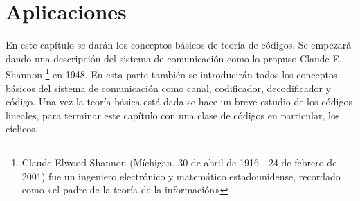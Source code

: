 \chapter{\quad Aplicaciones}
En este capítulo se darán los conceptos básicos de teoría de códigos. Se empezará dando una descripción del sistema de comunicación como lo propuso Claude E. Shannon \footnote{Claude Elwood Shannon (Míchigan, 30 de abril de 1916 - 24 de febrero de 2001) fue un ingeniero electrónico y matemático estadounidense, recordado como «el padre de la teoría de la información»} en 1948. En esta parte también se introducirán todos los conceptos básicos del sistema de comunicación como canal, codificador, decodificador y código. Una vez la teoría básica está dada se hace un breve estudio de los códigos lineales, para terminar este capítulo con una clase de códigos en particular, los cíclicos. 

